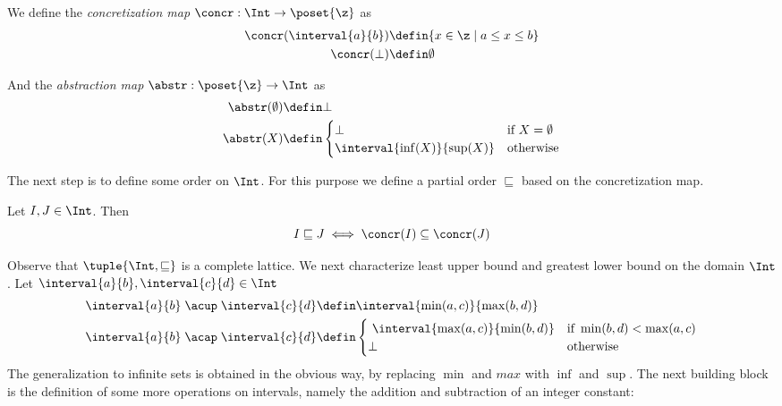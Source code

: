 \begin{definition}\label{def:concrint}
  We define the \emph{concretization map} \(\concr : \Int \to
  \poset{\z}\) as
  \begin{align*}
    \concr(\interval{a}{b}) & \defin \{x\in \z \mid a \leq x \leq b\} \\
    \concr(\bot) & \defin \emptyset
  \end{align*}

  And the \emph{abstraction map} \(\abstr:\poset{\z} \to \Int\) as
  \begin{align*}
    \abstr(\emptyset) & \defin \bot \\
    \abstr(X) & \defin
    \begin{cases}
      \bot & \text{if } X = \emptyset \\
      \interval{\inf(X)}{\sup(X)} & \text{otherwise}
    \end{cases}
  \end{align*}
\end{definition}
The next step is to define some order on \(\Int\). For this purpose
we define a partial order \(\sqsubseteq\) based on the concretization
map.
\begin{definition}\label{def:intpo}
  Let \(I,J \in \Int\). Then
  \begin{equation*}
    I \sqsubseteq J \iff \concr(I) \subseteq \concr(J)
  \end{equation*}
\end{definition}
Observe that \(\tuple{\Int,\sqsubseteq}\) is a complete lattice. We
next characterize least upper bound and greatest lower bound on the
domain \(\Int\). Let \({\interval{a}{b}, \interval{c}{d}\in \Int}\)
\begin{align*}
  \interval{a}{b} \; \acup \; \interval{c}{d} & \defin \interval{\min(a,c)}{\max(b,d)} \\
  \interval{a}{b} \; \acap \; \interval{c}{d} & \defin
                                                \begin{cases} \
                                                  \interval{\max(a,c)}{\min(b,d)} & \text{if } \min(b,d) < \max(a,c) \\
                                                  \bot & \text{otherwise}
                                                \end{cases}
\end{align*}
The generalization to infinite sets is obtained in the obvious way, by
replacing \(\min\) and \(max\) with \(\inf\) and \(\sup\).
\noindent
The next building block is the definition of some more operations on
intervals, namely the addition and subtraction of an integer constant:

